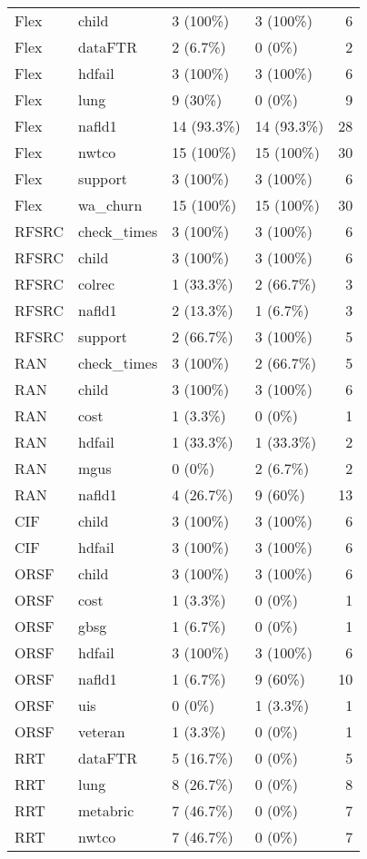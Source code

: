\begin{table}
\begin{tabular}[t]{llllr}
Flex & child & 3 (100\%) & 3 (100\%) & 6\\
Flex & dataFTR & 2 (6.7\%) & 0 (0\%) & 2\\
Flex & hdfail & 3 (100\%) & 3 (100\%) & 6\\
Flex & lung & 9 (30\%) & 0 (0\%) & 9\\
Flex & nafld1 & 14 (93.3\%) & 14 (93.3\%) & 28\\
Flex & nwtco & 15 (100\%) & 15 (100\%) & 30\\
Flex & support & 3 (100\%) & 3 (100\%) & 6\\
Flex & wa\_churn & 15 (100\%) & 15 (100\%) & 30\\
RFSRC & check\_times & 3 (100\%) & 3 (100\%) & 6\\
RFSRC & child & 3 (100\%) & 3 (100\%) & 6\\
RFSRC & colrec & 1 (33.3\%) & 2 (66.7\%) & 3\\
RFSRC & nafld1 & 2 (13.3\%) & 1 (6.7\%) & 3\\
RFSRC & support & 2 (66.7\%) & 3 (100\%) & 5\\
RAN & check\_times & 3 (100\%) & 2 (66.7\%) & 5\\
RAN & child & 3 (100\%) & 3 (100\%) & 6\\
RAN & cost & 1 (3.3\%) & 0 (0\%) & 1\\
RAN & hdfail & 1 (33.3\%) & 1 (33.3\%) & 2\\
RAN & mgus & 0 (0\%) & 2 (6.7\%) & 2\\
RAN & nafld1 & 4 (26.7\%) & 9 (60\%) & 13\\
CIF & child & 3 (100\%) & 3 (100\%) & 6\\
CIF & hdfail & 3 (100\%) & 3 (100\%) & 6\\
ORSF & child & 3 (100\%) & 3 (100\%) & 6\\
ORSF & cost & 1 (3.3\%) & 0 (0\%) & 1\\
ORSF & gbsg & 1 (6.7\%) & 0 (0\%) & 1\\
ORSF & hdfail & 3 (100\%) & 3 (100\%) & 6\\
ORSF & nafld1 & 1 (6.7\%) & 9 (60\%) & 10\\
ORSF & uis & 0 (0\%) & 1 (3.3\%) & 1\\
ORSF & veteran & 1 (3.3\%) & 0 (0\%) & 1\\
RRT & dataFTR & 5 (16.7\%) & 0 (0\%) & 5\\
RRT & lung & 8 (26.7\%) & 0 (0\%) & 8\\
RRT & metabric & 7 (46.7\%) & 0 (0\%) & 7\\
RRT & nwtco & 7 (46.7\%) & 0 (0\%) & 7\\

\end{tabular}
\end{table}
